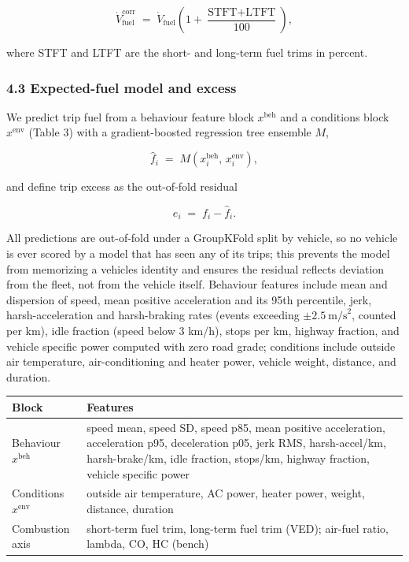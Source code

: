 \begin{equation} \dot V^{\text{corr}}_{\text{fuel}} \;=\; \dot V_{\text{fuel}}\left(1 + \frac{\text{STFT}+\text{LTFT}}{100}\right), \end{equation}

where STFT and LTFT are the short- and long-term fuel trims in percent.

\subsubsection{4.3 Expected-fuel model and
excess}\label{expected-fuel-model-and-excess}

We predict trip fuel from a behaviour feature block \(x^{\text{beh}}\)
and a conditions block \(x^{\text{env}}\) (Table 3) with a
gradient-boosted regression tree ensemble \(M\),

\begin{equation} \hat f_i \;=\; M\!\left(x^{\text{beh}}_i,\, x^{\text{env}}_i\right), \end{equation}

and define trip excess as the out-of-fold residual

\begin{equation} e_i \;=\; f_i - \hat f_i . \end{equation}

All predictions are out-of-fold under a GroupKFold split by vehicle, so
no vehicle is ever scored by a model that has seen any of its trips;
this prevents the model from memorizing a vehicle\textquotesingle s
identity and ensures the residual reflects deviation from the fleet, not
from the vehicle itself. Behaviour features include mean and dispersion
of speed, mean positive acceleration and its 95th percentile, jerk,
harsh-acceleration and harsh-braking rates (events exceeding
\(\pm 2.5\ \text{m/s}^2\), counted per km), idle fraction (speed below 3
km/h), stops per km, highway fraction, and vehicle specific power
computed with zero road grade; conditions include outside air
temperature, air-conditioning and heater power, vehicle weight,
distance, and duration.

\begin{longtable}[]{@{}ll@{}}
\toprule\noalign{}
Block & Features \\
\midrule\noalign{}
\endhead
\bottomrule\noalign{}
\endlastfoot
Behaviour \(x^{\text{beh}}\) & speed mean, speed SD, speed p85, mean
positive acceleration, acceleration p95, deceleration p05, jerk RMS,
harsh-accel/km, harsh-brake/km, idle fraction, stops/km, highway
fraction, vehicle specific power \\
Conditions \(x^{\text{env}}\) & outside air temperature, AC power,
heater power, weight, distance, duration \\
Combustion axis & short-term fuel trim, long-term fuel trim (VED);
air-fuel ratio, lambda, CO, HC (bench) \\
\end{longtable}

